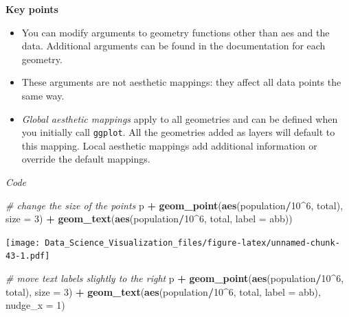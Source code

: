 \documentclass[
]{article}
\newenvironment{Shaded}{\begin{snugshade}}{\end{snugshade}}
\newcommand{\CommentTok}[1]{\textcolor[rgb]{0.56,0.35,0.01}{\textit{#1}}}
\newcommand{\DataTypeTok}[1]{\textcolor[rgb]{0.13,0.29,0.53}{#1}}
\newcommand{\DecValTok}[1]{\textcolor[rgb]{0.00,0.00,0.81}{#1}}
\newcommand{\KeywordTok}[1]{\textcolor[rgb]{0.13,0.29,0.53}{\textbf{#1}}}
\newcommand{\NormalTok}[1]{#1}
\newcommand{\OperatorTok}[1]{\textcolor[rgb]{0.81,0.36,0.00}{\textbf{#1}}}
\newcommand{\StringTok}[1]{\textcolor[rgb]{0.31,0.60,0.02}{#1}}
\providecommand{\tightlist}{%
  \setlength{\itemsep}{0pt}\setlength{\parskip}{0pt}}
\begin{document}
\textbf{Key points}

\begin{itemize}
\tightlist
\item
  You can modify arguments to geometry functions other than aes and the
  data. Additional arguments can be found in the documentation for each
  geometry.
\item
  These arguments are not aesthetic mappings: they affect all data
  points the same way.
\item
  \emph{Global aesthetic mappings} apply to all geometries and can be
  defined when you initially call \texttt{ggplot}. All the geometries
  added as layers will default to this mapping. Local aesthetic mappings
  add additional information or override the default mappings.
\end{itemize}

\emph{Code}

\begin{Shaded}
\begin{Highlighting}[]
\CommentTok{# change the size of the points}
\NormalTok{p }\OperatorTok{+}\StringTok{ }\KeywordTok{geom_point}\NormalTok{(}\KeywordTok{aes}\NormalTok{(population}\OperatorTok{/}\DecValTok{10}\OperatorTok{^}\DecValTok{6}\NormalTok{, total), }\DataTypeTok{size =} \DecValTok{3}\NormalTok{) }\OperatorTok{+}
\StringTok{    }\KeywordTok{geom_text}\NormalTok{(}\KeywordTok{aes}\NormalTok{(population}\OperatorTok{/}\DecValTok{10}\OperatorTok{^}\DecValTok{6}\NormalTok{, total, }\DataTypeTok{label =}\NormalTok{ abb))}
\end{Highlighting}
\end{Shaded}

\texttt{[image: Data\_Science\_Visualization\_files/figure-latex/unnamed-chunk-43-1.pdf]}

\begin{Shaded}
\begin{Highlighting}[]
\CommentTok{# move text labels slightly to the right}
\NormalTok{p }\OperatorTok{+}\StringTok{ }\KeywordTok{geom_point}\NormalTok{(}\KeywordTok{aes}\NormalTok{(population}\OperatorTok{/}\DecValTok{10}\OperatorTok{^}\DecValTok{6}\NormalTok{, total), }\DataTypeTok{size =} \DecValTok{3}\NormalTok{) }\OperatorTok{+}
\StringTok{    }\KeywordTok{geom_text}\NormalTok{(}\KeywordTok{aes}\NormalTok{(population}\OperatorTok{/}\DecValTok{10}\OperatorTok{^}\DecValTok{6}\NormalTok{, total, }\DataTypeTok{label =}\NormalTok{ abb), }\DataTypeTok{nudge_x =} \DecValTok{1}\NormalTok{)}
\end{Highlighting}
\end{Shaded}
\end{document}
